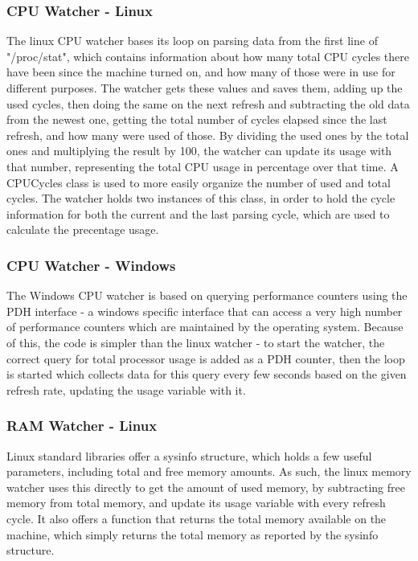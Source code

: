 \documentclass{l3proj}
\begin{document}
\subsubsection{CPU Watcher - Linux}

The linux CPU watcher bases its loop on parsing data from the first line of "/proc/stat", which contains information about how many total CPU cycles there have been since the machine turned on, and how many of those were in use for different purposes. The watcher gets these values and saves them, adding up the used cycles, then doing the same on the next refresh and subtracting the old data from the newest one, getting the total number of cycles elapsed since the last refresh, and how many were used of those. By dividing the used ones by the total ones and multiplying the result by 100, the watcher can update its usage with that number, representing the total CPU usage in percentage over that time.
A CPUCycles class is used to more easily organize the number of used and total cycles. The watcher holds two instances of this class, in order to hold the cycle information for both the current and the last parsing cycle, which are used to calculate the precentage usage.

\subsubsection{CPU Watcher - Windows}

The Windows CPU watcher is based on querying performance counters using the PDH interface - a windows specific interface that can access a very high number of performance counters which are maintained by the operating system. Because of this, the code is simpler than the linux watcher - to start the watcher, the correct query for total processor usage is added as a PDH counter, then the loop is started which collects data for this query every few seconds based on the given refresh rate, updating the usage variable with it.

\subsubsection{RAM Watcher - Linux}

Linux standard libraries offer a sysinfo structure, which holds a few useful parameters, including total and free memory amounts. As such, the linux memory watcher uses this directly to get the amount of used memory, by subtracting free memory from total memory, and update its usage variable with every refresh cycle. It also offers a function that returns the total memory available on the machine, which simply returns the total memory as reported by the sysinfo structure.
\end{document}
